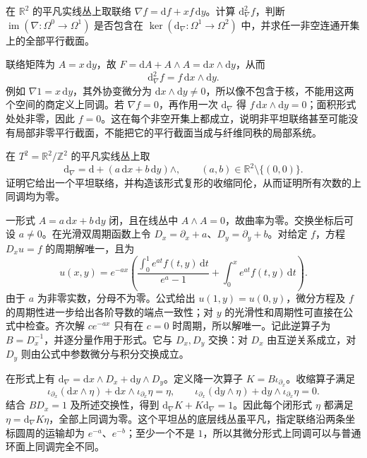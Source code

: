 \begin{exercise}\label{g2:ex:curvature-obstructs-complex}
	在 \(\mathbb R^2\) 的平凡实线丛上取联络 \(\nabla f=\mathrm df+x f\,\mathrm dy\)。计算 \(\mathrm d_\nabla^2f\)，判断 \(\operatorname{im}(\nabla:\Omega^0\to\Omega^1)\) 是否包含在 \(\ker(\mathrm d_\nabla:\Omega^1\to\Omega^2)\) 中，并求任一非空连通开集上的全部平行截面。
\end{exercise}
\begin{solution}
	联络矩阵为 \(A=x\,\mathrm dy\)，故 \(F=\mathrm dA+A\wedge A=\mathrm dx\wedge\mathrm dy\)，从而
	\[
		\mathrm d_\nabla^2f=f\,\mathrm dx\wedge\mathrm dy.
	\]
	例如 \(\nabla1=x\,\mathrm dy\)，其外协变微分为 \(\mathrm dx\wedge\mathrm dy\ne0\)，所以像不包含于核，不能用这两个空间的商定义上同调。若 \(\nabla f=0\)，再作用一次 \(\mathrm d_\nabla\) 得 \(f\,\mathrm dx\wedge\mathrm dy=0\)；面积形式处处非零，因此 \(f=0\)。这在每个非空开集上都成立，说明非平坦联络甚至可能没有局部非零平行截面，不能把它的平行截面当成与纤维同秩的局部系统。
\end{solution}

\begin{exercise}\label{g2:ex:flat-torus-contracting-homotopy}
	在 \(T^2=\mathbb R^2/\mathbb Z^2\) 的平凡实线丛上取
	\[
		\mathrm d_\nabla=\mathrm d+(a\,\mathrm dx+b\,\mathrm dy)\wedge,
		\qquad (a,b)\in\mathbb R^2\setminus\{(0,0)\}.
	\]
	证明它给出一个平坦联络，并构造该形式复形的收缩同伦，从而证明所有次数的上同调均为零。
\end{exercise}
\begin{solution}
	一形式 \(A=a\,\mathrm dx+b\,\mathrm dy\) 闭，且在线丛中 \(A\wedge A=0\)，故曲率为零。交换坐标后可设 \(a\ne0\)。在光滑双周期函数上令 \(D_x=\partial_x+a\)、\(D_y=\partial_y+b\)。对给定 \(f\)，方程 \(D_xu=f\) 的周期解唯一，且为
	\[
		u(x,y)=e^{-ax}\left(\frac{\int_0^1e^{at}f(t,y)\,\mathrm dt}{e^a-1}
		+\int_0^x e^{at}f(t,y)\,\mathrm dt\right).
	\]
	由于 \(a\) 为非零实数，分母不为零。公式给出 \(u(1,y)=u(0,y)\)，微分方程及 \(f\) 的周期性进一步给出各阶导数的端点一致性；对 \(y\) 的光滑性和周期性可直接在公式中检查。齐次解 \(ce^{-ax}\) 只有在 \(c=0\) 时周期，所以解唯一。记此逆算子为 \(B=D_x^{-1}\)，并逐分量作用于形式。它与 \(D_x,D_y\) 交换：对 \(D_x\) 由互逆关系成立，对 \(D_y\) 则由公式中参数微分与积分交换成立。

	在形式上有 \(\mathrm d_\nabla=\mathrm dx\wedge D_x+\mathrm dy\wedge D_y\)。定义降一次算子 \(K=B\iota_{\partial_x}\)。收缩算子满足
	\[
		\iota_{\partial_x}(\mathrm dx\wedge\eta)+\mathrm dx\wedge\iota_{\partial_x}\eta=\eta,
		\qquad
		\iota_{\partial_x}(\mathrm dy\wedge\eta)+\mathrm dy\wedge\iota_{\partial_x}\eta=0.
	\]
	结合 \(BD_x=1\) 及所述交换性，得到 \(\mathrm d_\nabla K+K\mathrm d_\nabla=1\)。因此每个闭形式 \(\eta\) 都满足 \(\eta=\mathrm d_\nabla K\eta\)，全部上同调为零。这个平坦丛的底层线丛虽平凡，指定联络沿两条坐标圆周的运输却为 \(e^{-a}\)、\(e^{-b}\)；至少一个不是 \(1\)，所以其微分形式上同调可以与普通环面上同调完全不同。
\end{solution}
